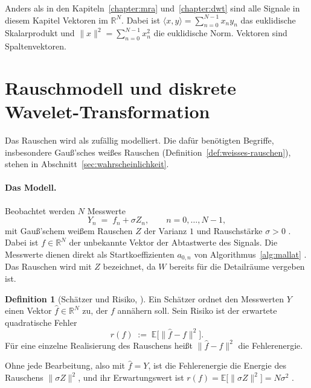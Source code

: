 \documentclass[a4paper,11pt,bibliography=totoc,listof=totoc,headinclude=true,cleardoublepage=empty,oneside]{scrbook}
\theoremstyle{plain}
\theoremstyle{definition}
\newtheorem{Definition}[Satz]{Definition}
\newcommand{\R}{\mathbb{R}}
\newcommand{\scal}[2]{\langle #1, #2 \rangle}
\newcommand{\norm}[1]{\lVert #1 \rVert}
\begin{document}
Anders als in den Kapiteln~\ref{chapter:mra} und~\ref{chapter:dwt} sind alle
Signale in diesem Kapitel Vektoren im $\R^N$. Dabei ist
$\scal{x}{y} = \sum_{n=0}^{N-1} x_ny_n$ das euklidische Skalarprodukt und
$\norm{x}^2 = \sum_{n=0}^{N-1} x_n^2$ die euklidische Norm. Vektoren sind
Spaltenvektoren.
 
\section{Rauschmodell und diskrete Wavelet-Transformation}
\label{sec:onb-invarianz}
 
Das Rauschen wird als zufällig modelliert. Die dafür benötigten Begriffe,
insbesondere Gau\ss'sches wei\ss es Rauschen
(Definition~\ref{def:weisses-rauschen}), stehen in
Abschnitt~\ref{sec:wahrscheinlichkeit}.
 
\paragraph{Das Modell.}
Beobachtet werden $N$ Messwerte
\begin{equation}
\label{eq:rauschmodell}
  Y_n \;=\; f_n + \sigma Z_n, \qquad n = 0,\dots,N-1,
\end{equation}
mit Gau\ss'schem wei\ss em Rauschen $Z$ der Varianz $1$ und Rauschstärke
$\sigma>0$ \cite[Gl.~(11.26)]{mallat}. %
Dabei ist $f\in\R^N$ der unbekannte Vektor der Abtastwerte des Signals. Die
Messwerte dienen direkt als Startkoeffizienten $a_{0,n}$ von
Algorithmus~\ref{alg:mallat} \cite[Kap.~3.1.1]{lmr}. %
Das Rauschen wird mit $Z$ bezeichnet, da $W$ bereits für die Detailräume
vergeben ist.
 
\begin{Definition}[Schätzer und Risiko, {\cite[Kap.~1.2.4]{mallat}}] %
\label{def:risiko}
Ein Schätzer ordnet den Messwerten $Y$ einen Vektor $\hat f\in\R^N$ zu, der $f$
annähern soll. Sein Risiko ist der erwartete quadratische Fehler
\[
  r(f) \;:=\; \mathbb E\bigl[\norm{\hat f - f}^2\bigr] .
\]
Für eine einzelne Realisierung des Rauschens hei\ss t $\norm{\hat f - f}^2$ die
Fehlerenergie.
\end{Definition}
 
Ohne jede Bearbeitung, also mit $\hat f = Y$, ist die Fehlerenergie die
Energie des Rauschens $\norm{\sigma Z}^2$, und ihr Erwartungswert ist
$r(f) = \mathbb E\bigl[\norm{\sigma Z}^2\bigr] = N\sigma^2$
\cite[Kap.~11.1.1]{mallat}. %
 
\end{document}

